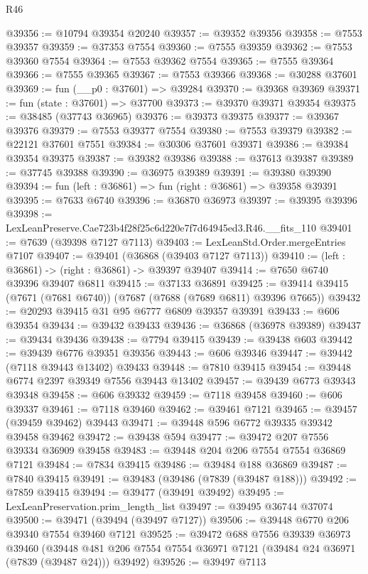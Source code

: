 \begin{lexlean}{R46}
\begin{coremodule}
@39356 := @10794 @39354 @20240
@39357 := @39352 @39356
@39358 := @7553 @39357
@39359 := @37353 @7554
@39360 := @7555 @39359
@39362 := @7553 @39360 @7554
@39364 := @7553 @39362 @7554
@39365 := @7555 @39364
@39366 := @7555 @39365
@39367 := @7553 @39366
@39368 := @30288 @37601
@39369 := fun (__p0 : @37601) => @39284
@39370 := @39368 @39369
@39371 := fun (state : @37601) => @37700
@39373 := @39370 @39371 @39354
@39375 := @38485 (@37743 @36965)
@39376 := @39373 @39375
@39377 := @39367 @39376
@39379 := @7553 @39377 @7554
@39380 := @7553 @39379
@39382 := @22121 @37601 @7551
@39384 := @30306 @37601 @39371
@39386 := @39384 @39354 @39375
@39387 := @39382 @39386
@39388 := @37613 @39387
@39389 := @37745 @39388
@39390 := @36975 @39389
@39391 := @39380 @39390
@39394 := fun (left : @36861) => fun (right : @36861) => @39358 @39391
@39395 := @7633 @6740
@39396 := @36870 @36973
@39397 := @39395 @39396
@39398 := LexLeanPreserve.Cae723b4f28f25c6d220e7f7d64945ed3.R46.__fits_110
@39401 := @7639 (@39398 @7127 @7113)
@39403 := LexLeanStd.Order.mergeEntries @7107
@39407 := @39401 (@36868 (@39403 @7127 @7113))
@39410 := (left : @36861) -> (right : @36861) -> @39397 @39407
@39414 := @7650 @6740 @39396 @39407 @6811
@39415 := @37133 @36891
@39425 := @39414 @39415 (@7671 (@7681 @6740)) (@7687 (@7688 (@7689 @6811) @39396 @7665))
@39432 := @20293 @39415 @31 @95 @6777 @6809 @39357 @39391
@39433 := @606 @39354
@39434 := @39432 @39433
@39436 := @36868 (@36978 @39389)
@39437 := @39434 @39436
@39438 := @7794 @39415
@39439 := @39438 @603
@39442 := @39439 @6776 @39351 @39356
@39443 := @606 @39346
@39447 := @39442 (@7118 @39443 @13402) @39433
@39448 := @7810 @39415
@39454 := @39448 @6774 @2397 @39349 @7556 @39443 @13402
@39457 := @39439 @6773 @39343 @39348
@39458 := @606 @39332
@39459 := @7118 @39458
@39460 := @606 @39337
@39461 := @7118 @39460
@39462 := @39461 @7121
@39465 := @39457 (@39459 @39462) @39443
@39471 := @39448 @596 @6772 @39335 @39342 @39458 @39462
@39472 := @39438 @594
@39477 := @39472 @207 @7556 @39334 @36909 @39458
@39483 := @39448 @204 @206 @7554 @7554 @36869 @7121
@39484 := @7834 @39415
@39486 := @39484 @188 @36869
@39487 := @7840 @39415
@39491 := @39483 (@39486 (@7839 (@39487 @188)))
@39492 := @7859 @39415
@39494 := @39477 (@39491 @39492)
@39495 := LexLeanPreservation.prim_length_list
@39497 := @39495 @36744 @37074
@39500 := @39471 (@39494 (@39497 @7127))
@39506 := @39448 @6770 @206 @39340 @7554 @39460 @7121
@39525 := @39472
    @688
    @7556
    @39339
    @36973
    @39460
    (@39448 @481 @206 @7554 @7554 @36971 @7121 (@39484 @24 @36971 (@7839 (@39487 @24))) @39492)
@39526 := @39497 @7113

\end{coremodule}
\end{lexlean}
